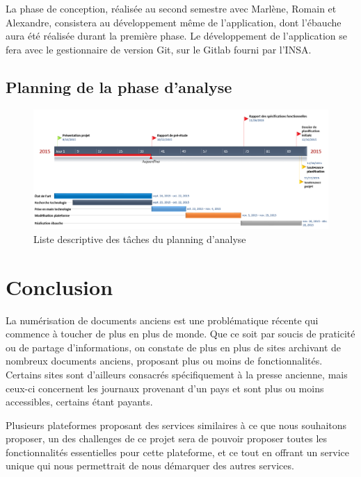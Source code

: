     La phase de conception, réalisée au second semestre avec Marlène, Romain et Alexandre, consistera au développement
    même de l’application, dont l’ébauche aura été réalisée durant la première phase. Le développement de l’application
    se fera avec le gestionnaire de version Git,  sur le Gitlab fourni par l’INSA.

    \pagebreak

    \subsection{Planning de la phase d’analyse}
    \label{subsec:planing}

    \begin{figure}[H]
        \centering
        \includegraphics[width=1.3\textwidth, angle=90]{figure/timeline.png}
            \caption{Liste descriptive des tâches du planning d'analyse}
            \label{fig:description}
    \end{figure}

\section{Conclusion}
\label{Conclusion}
La numérisation de documents anciens est une problématique récente qui commence à toucher de plus en plus de monde.
Que ce soit par soucis de praticité ou de partage d’informations, on constate de plus en plus de sites archivant
de nombreux documents anciens, proposant plus ou moins de fonctionnalités. Certains sites sont d’ailleurs
consacrés spécifiquement à la presse ancienne, mais ceux-ci concernent les journaux provenant d’un pays
et sont plus ou moins accessibles, certains étant payants.

Plusieurs plateformes proposant des services similaires à ce que nous souhaitons proposer, un des challenges
de ce projet sera de pouvoir proposer toutes les fonctionnalités essentielles pour cette plateforme, et ce
tout en offrant un service unique qui nous permettrait de nous démarquer des autres services.

